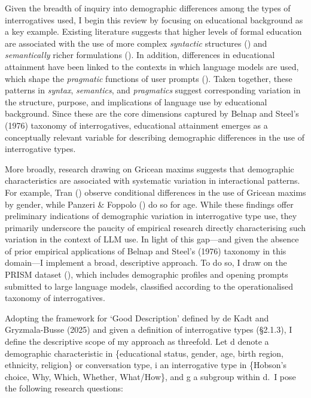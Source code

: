 \documentclass[
  12pt,
]{article}
\begin{document}
Given the breadth of inquiry into demographic differences among the types of interrogatives used, I begin this review by focusing on educational background as a key example. Existing literature suggests that higher levels of formal education are associated with the use of more complex \emph{syntactic} structures () and \emph{semantically} richer formulations (). In addition, differences in educational attainment have been linked to the contexts in which language models are used, which shape the \emph{pragmatic} functions of user prompts (). Taken together, these patterns in \emph{syntax}, \emph{semantics}, and \emph{pragmatics} suggest corresponding variation in the structure, purpose, and implications of language use by educational background. Since these are the core dimensions captured by Belnap and Steel's (1976) taxonomy of interrogatives, educational attainment emerges as a conceptually relevant variable for describing demographic differences in the use of interrogative types.

More broadly, research drawing on Gricean maxims suggests that demographic characteristics are associated with systematic variation in interactional patterns. For example, Tran () observe conditional differences in the use of Gricean maxims by gender, while Panzeri \& Foppolo () do so for age. While these findings offer preliminary indications of demographic variation in interrogative type use, they primarily underscore the paucity of empirical research directly characterising such variation in the context of LLM use. In light of this gap---and given the absence of prior empirical applications of Belnap and Steel's (1976) taxonomy in this domain---I implement a broad, descriptive approach. To do so, I draw on the PRISM dataset (), which includes demographic profiles and opening prompts submitted to large language models, classified according to the operationalised taxonomy of interrogatives.

Adopting the framework for `Good Description' defined by de Kadt and Gryzmala-Busse (2025) and given a definition of interrogative types (§2.1.3), I define the descriptive scope of my approach as threefold. Let d denote a demographic characteristic in \{educational status, gender, age, birth region, ethnicity, religion\} or conversation type, i an interrogative type in \{Hobson's choice, Why, Which, Whether, What/How\}, and g a subgroup within d.~I pose the following research questions:
\end{document}
